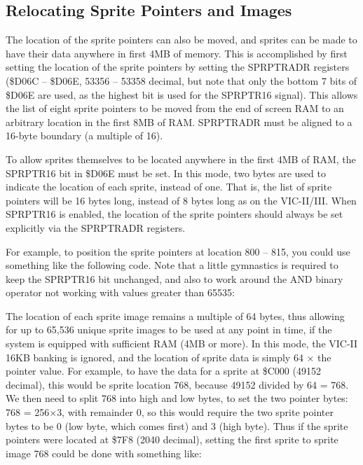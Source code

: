\subsection{Relocating Sprite Pointers and Images}

The location of the sprite pointers can also be moved, and sprites can be made to have their data anywhere in first 4MB of memory.
This is accomplished by first setting the location of the sprite pointers by setting the SPRPTRADR registers (\$D06C -- \$D06E, 53356 -- 53358 decimal, but note that only the bottom 7 bits of \$D06E are used, as the highest bit is used for the SPRPTR16 signal).  This allows the list of
eight sprite pointers to be moved from the end of screen RAM to an arbitrary location in the first 8MB of RAM. SPRPTRADR must be aligned to a 16-byte boundary (a multiple of 16).

To allow sprites themselves
to be located anywhere in the first 4MB of RAM, the SPRPTR16 bit in \$D06E must be set. In this mode, two bytes are used to indicate the
location of each sprite, instead of one. That is, the list of sprite pointers will be 16 bytes long, instead of 8 bytes long as on the VIC-II/III.  When SPRPTR16 is enabled, the location of the sprite pointers should always be set explicitly via the SPRPTRADR registers.

For example, to position the sprite pointers at location 800 -- 815, you could use something like the following code. Note that a little gymnastics is required to keep the SPRPTR16 bit unchanged, and also to work around the AND binary operator not working with values greater than 65535:


The location of each sprite image remains a multiple of 64 bytes, thus allowing for up to 65,536 unique sprite images
to be used at any point in time, if the system is equipped with sufficient RAM (4MB or more).  In this mode, the VIC-II 16KB banking is ignored, and the location of sprite data is simply 64 $\times$ the pointer value.  For example, to have the data for a sprite at \$C000 (49152 decimal), this would be sprite location 768, because 49152 divided by 64 = 768.  We then need to split 768 into high and low bytes, to set the two pointer bytes: 768 = 256$\times$3, with remainder 0, so this would require the two sprite pointer bytes to be 0 (low byte, which comes first) and 3 (high byte).  Thus if the sprite pointers were located at \$7F8 (2040 decimal), setting the first sprite to sprite image 768 could be done with something like:

